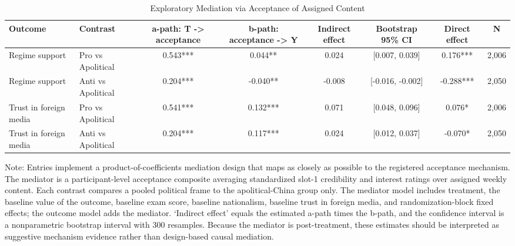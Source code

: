 \begin{table}[H]
\centering
\caption{Exploratory Mediation via Acceptance of Assigned Content}
\label{tab:acceptance_mediation}
\footnotesize
\begin{threeparttable}
\begin{tabular}{llcccccc}
\toprule
Outcome & Contrast & a-path: T -> acceptance & b-path: acceptance -> Y & Indirect effect & Bootstrap 95\% CI & Direct effect & N \\
\midrule
Regime support & Pro vs Apolitical & 0.543*** & 0.044** & 0.024 & [0.007, 0.039] & 0.176*** & 2,006 \\
Regime support & Anti vs Apolitical & 0.204*** & -0.040** & -0.008 & [-0.016, -0.002] & -0.288*** & 2,050 \\
Trust in foreign media & Pro vs Apolitical & 0.541*** & 0.132*** & 0.071 & [0.048, 0.096] & 0.076* & 2,006 \\
Trust in foreign media & Anti vs Apolitical & 0.204*** & 0.117*** & 0.024 & [0.012, 0.037] & -0.070* & 2,050 \\
\bottomrule
\end{tabular}
\begin{tablenotes}[flushleft]
\footnotesize
\item Note: Entries implement a product-of-coefficients mediation design that maps as closely as possible to the registered acceptance mechanism. The mediator is a participant-level acceptance composite averaging standardized slot-1 credibility and interest ratings over assigned weekly content. Each contrast compares a pooled political frame to the apolitical-China group only. The mediator model includes treatment, the baseline value of the outcome, baseline exam score, baseline nationalism, baseline trust in foreign media, and randomization-block fixed effects; the outcome model adds the mediator. `Indirect effect' equals the estimated a-path times the b-path, and the confidence interval is a nonparametric bootstrap interval with 300 resamples. Because the mediator is post-treatment, these estimates should be interpreted as suggestive mechanism evidence rather than design-based causal mediation.
\end{tablenotes}
\end{threeparttable}
\end{table}
